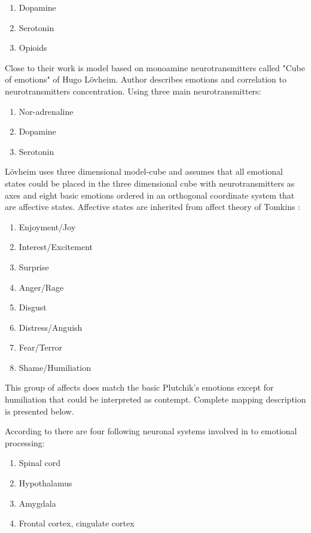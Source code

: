 \begin{enumerate}
\item  Dopamine
\item  Serotonin
\item  Opioids
\end{enumerate}

Close to their work is model based on monoamine neurotransmitters called "Cube of emotions" of Hugo Lövheim\cite{cubeofemotions}.
Author describes emotions and correlation to neurotransmitters concentration. Using three main neurotransmitters:

\begin{enumerate}
\item  Nor-adrenaline
\item  Dopamine
\item  Serotonin
\end{enumerate}

Lövheim uses three dimensional model-cube and assumes that all emotional states could be placed in the three dimensional cube with neurotransmitters as axes and eight basic emotions ordered in an orthogonal coordinate system that are affective states. Affective states are inherited from affect theory of Tomkins \cite{tomkins1, tomkins2, tomkins3, tomkins4}:

\begin{enumerate}
\item  Enjoyment/Joy
\item  Interest/Excitement
\item  Surprise
\item  Anger/Rage
\item  Disgust
\item  Distress/Anguish
\item  Fear/Terror
\item  Shame/Humiliation
\end{enumerate}

This group of affects does match the basic Plutchik's emotions except for humiliation that could be interpreted as contempt. Complete mapping description is presented below.

According to \cite{emotionsbraintorobot} there are four following neuronal systems involved in to emotional processing:

\begin{enumerate}
\item  Spinal cord
\item  Hypothalamus
\item  Amygdala
\item  Frontal cortex, cingulate cortex
\end{enumerate}

